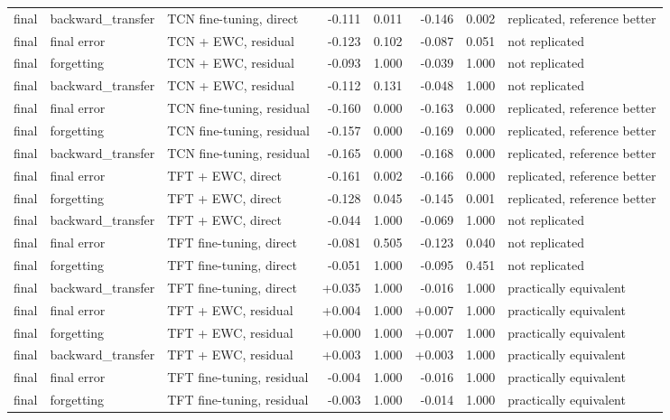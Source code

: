 \begin{table}[t]
\begin{tabular}{lllrrrrl}
    final & backward\_transfer & TCN fine-tuning, direct & -0.111 & 0.011 & -0.146 & 0.002 & replicated, reference better \\
    final & final error & TCN + EWC, residual & -0.123 & 0.102 & -0.087 & 0.051 & not replicated \\
    final & forgetting & TCN + EWC, residual & -0.093 & 1.000 & -0.039 & 1.000 & not replicated \\
    final & backward\_transfer & TCN + EWC, residual & -0.112 & 0.131 & -0.048 & 1.000 & not replicated \\
    final & final error & TCN fine-tuning, residual & -0.160 & 0.000 & -0.163 & 0.000 & replicated, reference better \\
    final & forgetting & TCN fine-tuning, residual & -0.157 & 0.000 & -0.169 & 0.000 & replicated, reference better \\
    final & backward\_transfer & TCN fine-tuning, residual & -0.165 & 0.000 & -0.168 & 0.000 & replicated, reference better \\
    final & final error & TFT + EWC, direct & -0.161 & 0.002 & -0.166 & 0.000 & replicated, reference better \\
    final & forgetting & TFT + EWC, direct & -0.128 & 0.045 & -0.145 & 0.001 & replicated, reference better \\
    final & backward\_transfer & TFT + EWC, direct & -0.044 & 1.000 & -0.069 & 1.000 & not replicated \\
    final & final error & TFT fine-tuning, direct & -0.081 & 0.505 & -0.123 & 0.040 & not replicated \\
    final & forgetting & TFT fine-tuning, direct & -0.051 & 1.000 & -0.095 & 0.451 & not replicated \\
    final & backward\_transfer & TFT fine-tuning, direct & +0.035 & 1.000 & -0.016 & 1.000 & practically equivalent \\
    final & final error & TFT + EWC, residual & +0.004 & 1.000 & +0.007 & 1.000 & practically equivalent \\
    final & forgetting & TFT + EWC, residual & +0.000 & 1.000 & +0.007 & 1.000 & practically equivalent \\
    final & backward\_transfer & TFT + EWC, residual & +0.003 & 1.000 & +0.003 & 1.000 & practically equivalent \\
    final & final error & TFT fine-tuning, residual & -0.004 & 1.000 & -0.016 & 1.000 & practically equivalent \\
    final & forgetting & TFT fine-tuning, residual & -0.003 & 1.000 & -0.014 & 1.000 & practically equivalent \\

\end{tabular}
\end{table}
